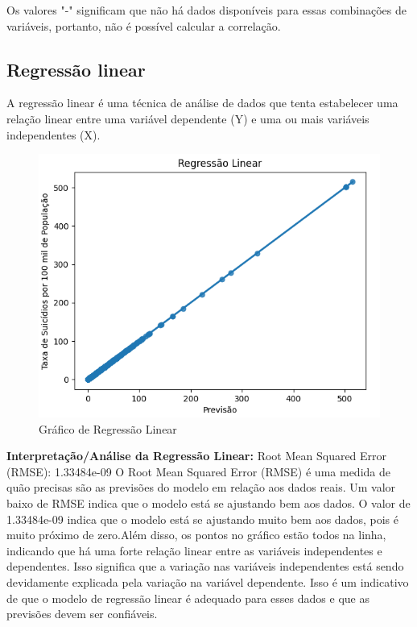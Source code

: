 \documentclass{article}
\begin{document}
Os valores "-" significam que não há dados disponíveis para essas combinações de variáveis, portanto, não é possível calcular a correlação.


\newpage
\subsection{Regressão linear}
A regressão linear é uma técnica de análise de dados que tenta estabelecer uma relação linear entre uma variável dependente (Y) e uma ou mais variáveis independentes (X). 

\bigskip
\begin{figure}[ht]
    \centering
   \includegraphics[scale=0.6]{regressaoL.png}
    \caption{Gráfico de Regressão Linear}
   \label{fig:RegressãoLinear}
\end{figure}
\medskip


 \textbf{Interpretação/Análise da Regressão Linear:}
\newline
 Root Mean Squared Error (RMSE): 1.33484e-09
\newline
O Root Mean Squared Error (RMSE) é uma medida de quão precisas são as previsões do modelo em relação aos dados reais. Um valor baixo de RMSE indica que o modelo está se ajustando bem aos dados. O valor de 1.33484e-09 indica que o modelo está se ajustando muito bem aos dados, pois é muito próximo de zero.Além disso, os pontos no gráfico estão todos na linha, indicando que há uma forte relação linear entre as variáveis independentes e dependentes. Isso significa que a variação nas variáveis independentes está sendo devidamente explicada pela variação na variável dependente. Isso é um indicativo de que o modelo de regressão linear é adequado para esses dados e que as previsões devem ser confiáveis.
\end{document}
